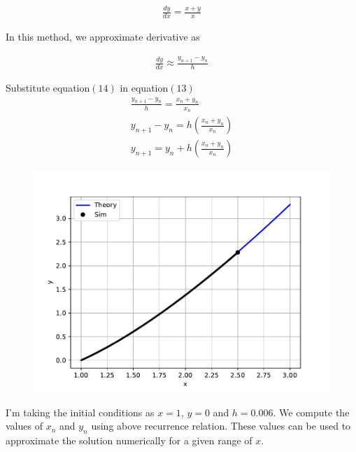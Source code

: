\documentclass[journal,12pt,onecolumn]{IEEEtran}
\theoremstyle{remark}
\begin{document}
\begin{align}
\frac{dy}{dx} = \frac{x+y}{x}
\end{align}

In this method, we approximate derivative as

\begin{align}
\frac{dy}{dx} \approx \frac{y_{n+1} - y_n}{h}
\end{align}

Substitute equation$(14)$ in equation$(13)$
\begin{align}
	\frac{y_{n+1} - y_n}{h} =  \frac{x_{n}+y_{n}}{x_{n}}\\
	y_{n+1}-y_n = h  (\frac{x_{n}+y_{n}}{x_{n}})\\
	y_{n+1} = y_n + h(\frac{x_{n}+y_{n}}{x_{n}})
\end{align}

\begin{figure}[h!]
   \centering
   \includegraphics[width=\columnwidth]{figs/fig.pdf}
\end{figure}

I'm taking the initial conditions as $x=1$, $y=0$ and $h=0.006$. We compute the values of $x_n$ and $y_n$ using above recurrence relation. These values can be used to approximate the solution numerically for a given range of $x$.
\end{document}
